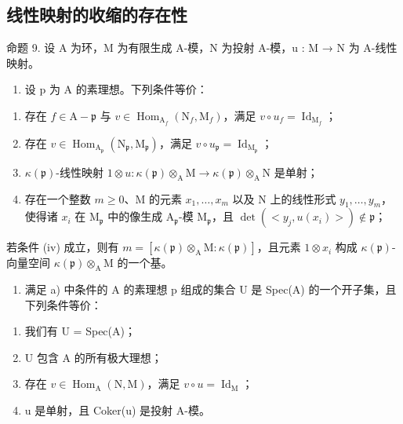 \subsection{线性映射的收缩的存在性}

命题 9. 设 A 为环，M 为有限生成 A-模，N 为投射 A-模，u : M → N 为 A-线性映射。

\begin{enumerate}
\def\labelenumi{\alph{enumi})}
\tightlist
\item
  设 p 为 A 的素理想。下列条件等价：
\end{enumerate}

\begin{enumerate}
\def\labelenumi{(\roman{enumi})}
\item
  存在 \(f \in \mathrm{A} - \mathfrak{p}\) 与 \(v \in \operatorname{Hom}_{\mathrm{A}_f}(\mathrm{N}_f, \mathrm{M}_f)\)，满足 \(v \circ u_f = \operatorname{Id}_{\mathrm{M}_f}\)；
\item
  存在 \(v \in \operatorname{Hom}_{\mathrm{A}_{\mathfrak{p}}}(\mathrm{N}_{\mathfrak{p}}, \mathrm{M}_{\mathfrak{p}})\)，满足 \(v \circ u_{\mathfrak{p}} = \operatorname{Id}_{\mathrm{M}_{\mathfrak{p}}}\)；
\item
  \(\kappa(\mathfrak{p})\text{-线性映射 }1 \otimes u : \kappa(\mathfrak{p}) \otimes_{\mathrm{A}} \mathrm{M} \to \kappa(\mathfrak{p}) \otimes_{\mathrm{A}} \mathrm{N}\) 是单射；
\item
  存在一个整数 \(m \geqslant 0\)、M 的元素 \(x_{1}, \ldots, x_{m}\) 以及 N 上的线性形式 \(y_{1}, \ldots, y_{m}\)，使得诸 \(x_{i}\) 在 \(\mathrm{M}_{\mathfrak{p}}\) 中的像生成 \(\mathrm{A}_{\mathfrak{p}}\)-模 \(\mathrm{M}_{\mathfrak{p}}\)，且 \(\det(<y_{j}, u(x_{i})>) \notin \mathfrak{p}\)；
\end{enumerate}

若条件 (iv) 成立，则有 \(m = [\kappa(\mathfrak{p}) \otimes_{\mathrm{A}} \mathrm{M} : \kappa(\mathfrak{p})]\)，且元素 \(1 \otimes x_i\) 构成 \(\kappa(\mathfrak{p})\)-向量空间 \(\kappa(\mathfrak{p}) \otimes_{\mathrm{A}} \mathrm{M}\) 的一个基。

\begin{enumerate}
\def\labelenumi{\alph{enumi})}
\setcounter{enumi}{1}
\tightlist
\item
  满足 a) 中条件的 A 的素理想 p 组成的集合 U 是 Spec(A) 的一个开子集，且下列条件等价：
\end{enumerate}

\begin{enumerate}
\def\labelenumi{(\roman{enumi})}
\item
  我们有 U = Spec(A)；
\item
  U 包含 A 的所有极大理想；
\item
  存在 \(v \in \operatorname{Hom}_{\mathrm{A}}(\mathrm{N}, \mathrm{M})\)，满足 \(v \circ u = \operatorname{Id}_{\mathrm{M}}\)；
\item
  u 是单射，且 Coker(u) 是投射 A-模。
\end{enumerate}


